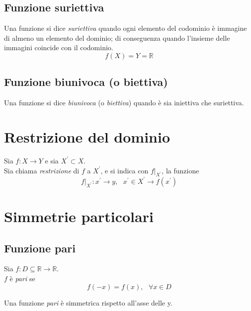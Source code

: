 \documentclass[a4paper,12pt, oneside]{book}
\begin{document}
\subsection{Funzione suriettiva}
\begin{definizione} Una funzione si dice \emph{suriettiva} quando ogni elemento
  del codominio è immagine di almeno un elemento del dominio; di conseguenza
  quando l’insieme delle immagini coincide con il codominio.
  \begin{equation} f(X)=Y=\mathbb{R}
  \end{equation}
\end{definizione}
\subsection{Funzione biunivoca (o biettiva)} Una funzione si dice
\emph{biunivoca} (o \emph{biettiva}) quando è sia iniettiva che suriettiva.
\section{Restrizione del dominio}
\begin{definizione} Sia $f:X\rightarrow Y$ e sia $X^{'}\subset X$.\\ Sia chiama
  \emph{restrizione} di $f$ a $X^{'}$, e si indica con $f|_{X^{'}}$, la funzione
  \begin{equation} f|_{X^{'}}:x^{'}\rightarrow y,\mbox{ } x^{'}\in X^{'}
    \rightarrow f(x^{'})
  \end{equation}
\end{definizione}
\section{Simmetrie particolari}
\subsection{Funzione pari}
\begin{definizione} Sia $f:D\subseteq \mathbb{R} \rightarrow \mathbb{R}$.\\ $f$
  è \emph{pari} se
  \begin{equation} f(-x)=f(x), \mbox{ } \forall x \in D
  \end{equation}
\end{definizione}
\begin{nota} Una funzione \emph{pari} è simmetrica rispetto all'asse delle y.
\end{nota}
\end{document}
